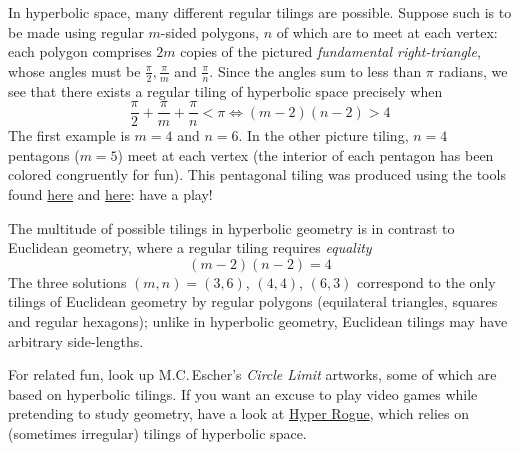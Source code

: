 In hyperbolic space, many different regular tilings are possible. Suppose such is to be made using regular $m$-sided polygons, $n$ of which are to meet at each vertex: each polygon comprises $2m$ copies of the pictured \emph{fundamental right-triangle}, whose angles must be $\frac\pi 2, \frac\pi m$ and $\frac\pi n$. Since the angles sum to less than $\pi$ radians, we see that there exists a regular tiling of hyperbolic space precisely when
	\[
		\frac\pi 2+\frac\pi m+\frac\pi n<\pi\iff (m-2)(n-2)>4
	\]
	The first example is $m=4$ and $n=6$. In the other picture tiling, $n=4$ pentagons ($m=5$) meet at each vertex (the interior of each pentagon has been colored congruently for fun). This pentagonal tiling was produced using the tools found
	\href{http://www.malinc.se/noneuclidean/en/poincaretiling.php}{here} and \href{http://www.malinc.se/m/ImageTiling.php}{here}: have a play!\medbreak
	
	The multitude of possible tilings in hyperbolic geometry is in contrast to Euclidean geometry, where a regular tiling requires \emph{equality}
	\[
		(m-2)(n-2)=4
	\]
	The three solutions $(m,n)=(3,6)$, $(4,4)$, $(6,3)$ correspond to the only tilings of Euclidean geometry by regular polygons (equilateral triangles, squares and regular hexagons); unlike in hyperbolic geometry, Euclidean tilings may have arbitrary side-lengths.\bigbreak
	
	For related fun, look up M.C.\,Escher's \emph{Circle Limit} artworks, some of which are based on hyperbolic tilings.
	If you want an excuse to play video games while pretending to study geometry, have a look at \href{http://www.roguetemple.com/z/hyper/}{Hyper Rogue}, which relies on (sometimes irregular) tilings of hyperbolic space.





